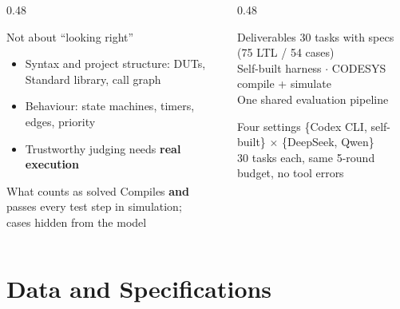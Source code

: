 \documentclass[10pt,aspectratio=169]{beamer}
\begin{document}
\begin{frame}
  \vspace{-2mm}
  \begin{columns}[T]
    \begin{column}{0.48\textwidth}
      \begin{alertblock}{Not about ``looking right''}
        \small
        \begin{itemize}
          \item Syntax and project structure: DUTs, Standard library, call graph
          \item Behaviour: state machines, timers, edges, priority
          \item Trustworthy judging needs \textbf{real execution}
        \end{itemize}
      \end{alertblock}
      \begin{block}{What counts as solved}
        \small
        Compiles \textbf{and} passes every test step in simulation;\\
        cases hidden from the model
      \end{block}
    \end{column}
    \begin{column}{0.48\textwidth}
      \begin{block}{Deliverables}
        \small
        30 tasks with specs (75 LTL / 54 cases)\\
        Self-built harness $\cdot$ CODESYS compile + simulate\\
        One shared evaluation pipeline
      \end{block}
      \begin{block}{Four settings}
        \small
        \{Codex CLI, self-built\} $\times$ \{DeepSeek, Qwen\}\\
        30 tasks each, same 5-round budget, no tool errors
      \end{block}
    \end{column}
  \end{columns}

\end{frame}

\section{Data and Specifications}
\end{document}
